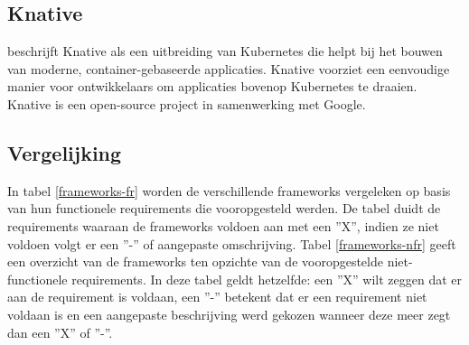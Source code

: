 \subsection{Knative}
\textcite{Pivotal2019} beschrijft Knative als een uitbreiding van Kubernetes die helpt bij het bouwen van moderne, container-gebaseerde applicaties. Knative voorziet een eenvoudige manier voor ontwikkelaars om applicaties bovenop Kubernetes te draaien. Knative is een open-source project in samenwerking met Google.

\subsection{Vergelijking}
In tabel \ref{frameworks-fr} worden de verschillende frameworks vergeleken op basis van hun functionele requirements die vooropgesteld  werden.  De tabel duidt de requirements waaraan de frameworks voldoen aan met een ''X'', indien ze niet voldoen volgt er een ''-'' of aangepaste omschrijving. Tabel \ref{frameworks-nfr} geeft een overzicht van de frameworks ten opzichte van de vooropgestelde niet-functionele requirements. In deze tabel geldt hetzelfde: een ''X'' wilt zeggen dat er aan de requirement is voldaan, een ''-'' betekent dat er een requirement niet voldaan is en een aangepaste beschrijving werd gekozen wanneer deze meer zegt dan een ''X'' of ''-''.

\begin{table}[]
    \caption{Vergelijking serverless frameworks op basis van functionele requirements}
    \label{frameworks-fr}
\end{table}



